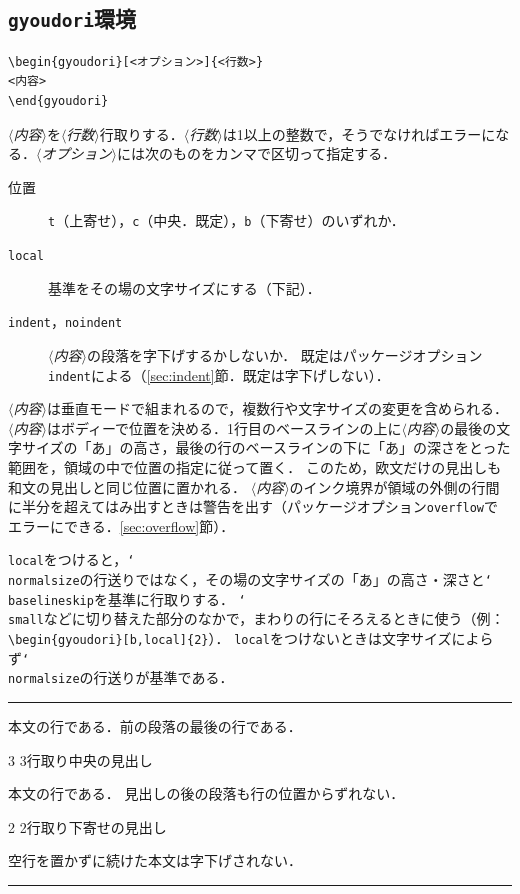 \documentclass[paper=a4,dvipdfmx]{jlreq}
\newcommand\opt[1]{\texttt{#1}}
\newcommand\env[1]{\texttt{#1}}
\newcommand\cs[1]{\texttt{\char`\\#1}}
\newcommand\meta[1]{$\langle$\textit{#1}$\rangle$}
\newenvironment{demo}
  {\par\medskip\noindent
   \begin{minipage}{\linewidth}\hrule\smallskip}
  {\par\smallskip\hrule\end{minipage}\par\medskip}
\begin{document}
\subsection{\env{gyoudori}環境}
\label{sec:env}

\begin{verbatim}
\begin{gyoudori}[<オプション>]{<行数>}
<内容>
\end{gyoudori}
\end{verbatim}
\meta{内容}を\meta{行数}行取りする．\meta{行数}は1以上の整数で，そうでなければエラーになる．\meta{オプション}には次のものをカンマで区切って指定する．
\begin{description}
\item[位置] \opt{t}（上寄せ），\opt{c}（中央．既定），\opt{b}（下寄せ）のいずれか．
\item[\opt{local}] 基準をその場の文字サイズにする（下記）．
\item[\opt{indent}，\opt{noindent}] \meta{内容}の段落を字下げするかしないか．
 既定はパッケージオプション\opt{indent}による（\ref{sec:indent}\nobreak 節．既定は字下げしない）．
\end{description}
\meta{内容}は垂直モードで組まれるので，複数行や文字サイズの変更を含められる．
\meta{内容}はボディーで位置を決める．1行目のベースラインの上に\meta{内容}の最後の文字サイズの「あ」の高さ，最後の行のベースラインの下に「あ」の深さをとった範囲を，領域の中で位置の指定に従って置く．
このため，欧文だけの見出しも和文の見出しと同じ位置に置かれる．
\meta{内容}のインク境界が領域の外側の行間に半分を超えてはみ出すときは警告を出す（パッケージオプション\opt{overflow}でエラーにできる．\ref{sec:overflow}\nobreak 節）．

\opt{local}をつけると，\cs{normalsize}の行送りではなく，その場の文字サイズの「あ」の高さ・深さと\cs{baselineskip}を基準に行取りする．
\cs{small}などに切り替えた部分のなかで，まわりの行にそろえるときに使う（例：\verb|\begin{gyoudori}[b,local]{2}|）．
\opt{local}をつけないときは文字サイズによらず\cs{normalsize}の行送りが基準である．

\begin{demo}
本文の行である．前の段落の最後の行である．
\begin{gyoudori}{3}
\large 3行取り中央の見出し
\end{gyoudori}

本文の行である．
見出しの後の段落も行の位置からずれない．
\begin{gyoudori}[b]{2}
2行取り下寄せの見出し
\end{gyoudori}
空行を置かずに続けた本文は字下げされない．
\end{demo}
\end{document}
